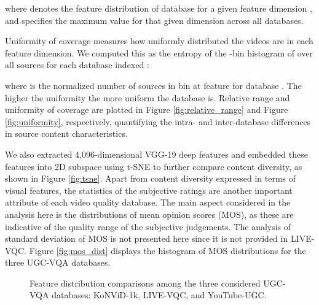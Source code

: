 \documentclass[journal]{IEEEtran}
\begin{document}
where  denotes the feature distribution of database  for a given feature dimension , and  specifies the maximum value for that given dimension across all databases. 

Uniformity of coverage measures how uniformly distributed the videos are in each feature dimension. We computed this as the entropy of the -bin histogram of  over all sources for each database indexed :

where  is the normalized number of sources in bin  at feature  for database . The higher the uniformity the more uniform the database is. Relative range and uniformity of coverage are plotted in Figure \ref{fig:relative_range} and Figure \ref{fig:uniformity}, respectively, quantifying the intra- and inter-database differences in source content characteristics.

We also extracted 4,096-dimensional VGG-19 \cite{simonyan2014very} deep features and embedded these features into 2D subspace using t-SNE \cite{maaten2008visualizing} to further compare content diversity, as shown in Figure \ref{fig:tsne}. Apart from content diversity expressed in terms of visual features, the statistics of the subjective ratings are another important attribute of each video quality database. The main aspect considered in the analysis here is the distributions of mean opinion scores (MOS), as these are indicative of the quality range of the subjective judgements. The analysis of standard deviation of MOS is not presented here since it is not provided in LIVE-VQC. Figure \ref{fig:mos_dist} displays the histogram of MOS distributions for the three UGC-VQA databases. 

\begin{figure*}[!t]
\captionsetup[subfigure]{justification=centering}
\centering
\def\xwidth{0.133}
\def\hswidth{-0.4em}
\hspace{\hswidth}
\hspace{\hswidth}
\hspace{\hswidth}
\hspace{\hswidth}
\hspace{\hswidth}
\caption{Feature distribution comparisons among the three considered UGC-VQA databases: KoNViD-1k, LIVE-VQC, and YouTube-UGC.}
\label{fig:ind_feat_dis}
\end{figure*}
\end{document}
